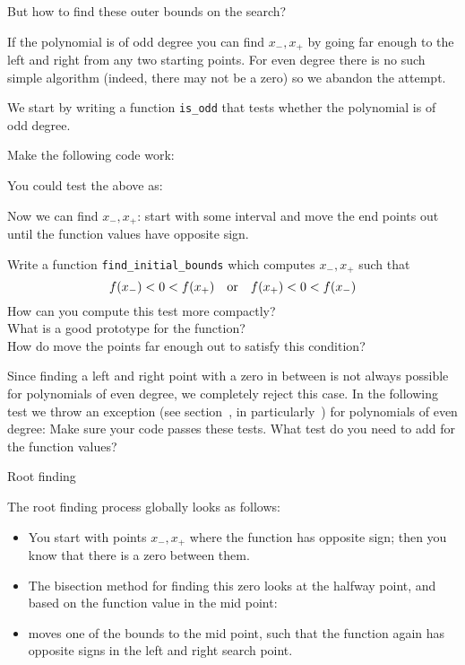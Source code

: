 But how to find these outer bounds on the search?

If the polynomial is of odd degree you can find $x_-,x_+$
by going far enough to the left and right
from any two starting points.
For even degree there is no such simple algorithm
(indeed, there may not be a zero)
so we abandon the attempt.

We start by writing a function \lstinline+is_odd+ that tests
whether the polynomial is of odd degree.

\begin{exercise}
  \label{ex:bisect-odd}
  Make the following code work:
\end{exercise}

You could test the above as:

Now we can find $x_-,x_+$: start with some interval
and move the end points out until the function values have opposite sign.

\begin{exercise}
  \label{ex:bisect-outer}
  Write a function \lstinline+find_initial_bounds+ which computes $x_-,x_+$
  such that
  \[ f(x_-)<0<f(x_+) \quad\hbox{or}\quad f(x_+)<0<f(x_-) \]
  How can you compute this test more compactly?\\
  What is a good prototype for the function?\\
  How do move the points far enough out to satisfy this condition?
\end{exercise}

Since finding a left and right point with a zero in between is not always
possible for polynomials of even degree, we completely reject this case.
In the following test we throw an exception
(see section~, in particularly~)
for polynomials of even degree:
Make sure your code passes these tests.
What test do you need to add
for the function values?

 {Root finding}

The root finding process globally looks as follows:
\begin{itemize}
\item You start with points $x_-,x_+$ where the function has
  opposite sign; then you know that there is a zero between them.
\item 
  The bisection method for finding this zero
  looks at the halfway point, and based on the function value
  in the mid point:
\item moves one of the bounds to the mid point, such that the function
  again has opposite signs in the left and right search point.
\end{itemize}

